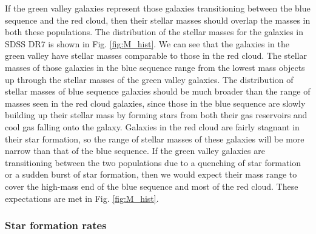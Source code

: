 If the green valley galaxies represent those galaxies transitioning between the 
blue sequence and the red cloud, then their stellar masses should overlap the 
masses in both these populations.  The distribution of the stellar masses for 
the galaxies in SDSS DR7 is shown in Fig. \ref{fig:M_hist}.  We can see that the 
galaxies in the green valley have stellar masses comparable to those in the red 
cloud.  The stellar masses of those galaxies in the blue sequence range from the 
lowest mass objects up through the stellar masses of the green valley galaxies.  
The distribution of stellar masses of blue sequence galaxies should be much 
broader than the range of masses seen in the red cloud galaxies, since those in 
the blue sequence are slowly building up their stellar mass by forming stars 
from both their gas reservoirs and cool gas falling onto the galaxy.  Galaxies 
in the red cloud are fairly stagnant in their star formation, so the range of 
stellar masses of these galaxies will be more narrow than that of the blue 
sequence.  If the green valley galaxies are transitioning between the two 
populations due to a quenching of star formation or a sudden burst of star 
formation, then we would expect their mass range to cover the high-mass end of 
the blue sequence and most of the red cloud.  These expectations are met in Fig. 
\ref{fig:M_hist}.


\subsubsection{Star formation rates}

